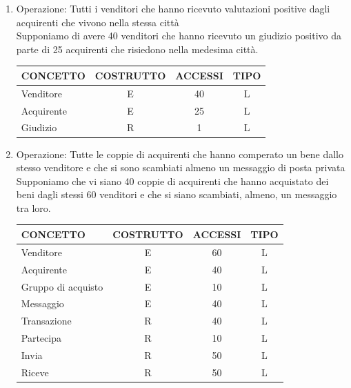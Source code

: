 \documentclass[a4paper, 10pt]{report}
\begin{document}
\begin{enumerate}
\item Operazione: Tutti i venditori che hanno ricevuto valutazioni positive dagli acquirenti che vivono nella stessa citt\`a\\
Supponiamo di avere 40 venditori che hanno ricevuto un giudizio positivo da parte di 25 acquirenti che risiedono nella medesima citt\`a.
\begin{table}[h!]
\centering
\begin{tabular}{|l|c|c|c|}
\hline
\textbf{CONCETTO}&\textbf{COSTRUTTO}&\textbf{ACCESSI}&\textbf{TIPO}\\
\hline
Venditore & E & 40 & L\\
\hline
Acquirente & E & 25 & L\\
\hline
Giudizio & R & 1 & L\\
\hline
\end{tabular}
\end{table}

\item Operazione: Tutte le coppie di acquirenti che hanno comperato un bene dallo stesso venditore e che si sono scambiati almeno un messaggio di posta privata\\
Supponiamo che vi siano 40 coppie di acquirenti che hanno acquistato dei beni dagli stessi 60 venditori e che si siano scambiati, almeno, un messaggio tra loro.
\begin{table}[h!]
\centering
\begin{tabular}{|l|c|c|c|}
\hline
\textbf{CONCETTO}&\textbf{COSTRUTTO}&\textbf{ACCESSI}&\textbf{TIPO}\\
\hline
Venditore & E & 60 & L\\ 
\hline
Acquirente & E & 40 & L\\
\hline
Gruppo di acquisto & E & 10 & L\\
\hline
Messaggio & E & 40 & L\\
\hline
Transazione & R & 40 & L\\
\hline
Partecipa & R & 10 & L\\
\hline
Invia & R & 50 & L\\
\hline
Riceve & R & 50 & L\\
\hline
\end{tabular}
\end{table}


\end{enumerate}
\end{document}
